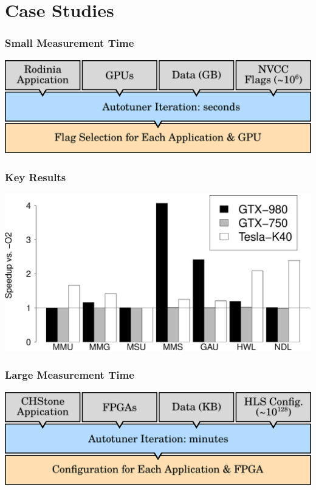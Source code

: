 \documentclass[10pt, compress, aspectratio=169]{beamer}
\begin{document}
\section{Case Studies}

\begin{frame}
    \frametitle{Small Measurement Time}
    \begin{center}
        \includegraphics[width=.9\textwidth]{overview_gpus}
    \end{center}
\end{frame}

\begin{frame}
    \frametitle{Key Results}
    \begin{center}
        \includegraphics[width=.9\textwidth]{GPU-tuning-summary}
    \end{center}
\end{frame}

\begin{frame}
    \frametitle{Large Measurement Time}
    \begin{center}
        \includegraphics[width=.8\textwidth]{overview_fpgas_small}
    \end{center}
\end{frame}
\end{document}
